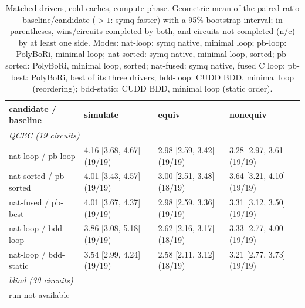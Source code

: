 \begin{table}[t]
\centering\footnotesize
\caption{Matched drivers, cold caches, compute phase. Geometric mean of the paired ratio baseline/candidate ($>1$: symq faster) with a 95\% bootstrap interval; in parentheses, wins/circuits completed by both, and circuits not completed (n/c) by at least one side. Modes: \textsf{nat-loop}: symq native, minimal loop; \textsf{pb-loop}: PolyBoRi, minimal loop; \textsf{nat-sorted}: symq native, minimal loop, sorted; \textsf{pb-sorted}: PolyBoRi, minimal loop, sorted; \textsf{nat-fused}: symq native, fused C loop; \textsf{pb-best}: PolyBoRi, best of its three drivers; \textsf{bdd-loop}: CUDD BDD, minimal loop (reordering); \textsf{bdd-static}: CUDD BDD, minimal loop (static order).}
\label{tab:matched}
\begin{tabular}{llll}
\toprule
candidate / baseline & simulate & equiv & nonequiv \\
\midrule
\multicolumn{4}{l}{\emph{QCEC (19 circuits)}} \\
\textsf{nat-loop} / \textsf{pb-loop} & 4.16 [3.68, 4.67]\,{\scriptsize(19/19)} & 2.98 [2.59, 3.42]\,{\scriptsize(19/19)} & 3.28 [2.97, 3.61]\,{\scriptsize(19/19)} \\
\textsf{nat-sorted} / \textsf{pb-sorted} & 4.01 [3.43, 4.57]\,{\scriptsize(19/19)} & 3.00 [2.51, 3.48]\,{\scriptsize(18/19)} & 3.64 [3.21, 4.10]\,{\scriptsize(19/19)} \\
\textsf{nat-fused} / \textsf{pb-best} & 4.01 [3.67, 4.37]\,{\scriptsize(19/19)} & 2.98 [2.59, 3.36]\,{\scriptsize(19/19)} & 3.31 [3.12, 3.50]\,{\scriptsize(19/19)} \\
\textsf{nat-loop} / \textsf{bdd-loop} & 3.86 [3.08, 5.18]\,{\scriptsize(19/19)} & 2.62 [2.16, 3.17]\,{\scriptsize(18/19)} & 3.33 [2.77, 4.00]\,{\scriptsize(19/19)} \\
\textsf{nat-loop} / \textsf{bdd-static} & 3.54 [2.99, 4.24]\,{\scriptsize(19/19)} & 2.58 [2.11, 3.12]\,{\scriptsize(18/19)} & 3.21 [2.77, 3.73]\,{\scriptsize(19/19)} \\
\midrule
\multicolumn{4}{l}{\emph{blind (30 circuits)}} \\
\multicolumn{4}{l}{run not available} \\
\bottomrule
\end{tabular}
\end{table}
